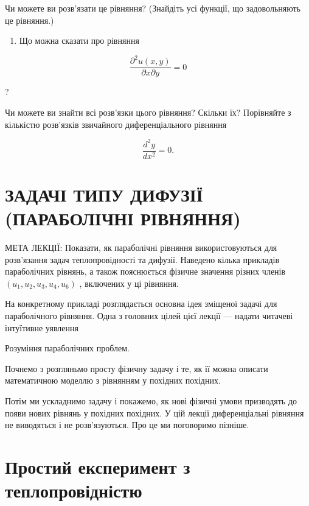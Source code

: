 \documentclass[
  ukrainian,
]{article}
\providecommand{\tightlist}{%
  \setlength{\itemsep}{0pt}\setlength{\parskip}{0pt}}
\begin{document}
Чи можете ви розв'язати це рівняння? (Знайдіть усі функції, що
задовольняють це рівняння.)

\begin{enumerate}
\def\labelenumi{\arabic{enumi}.}
\setcounter{enumi}{4}
\tightlist
\item
  Що можна сказати про рівняння
\end{enumerate}

\[\frac{\partial^2 u(x, y)}{\partial x \partial y} = 0\]

?

Чи можете ви знайти всі розв'язки цього рівняння? Скільки їх? Порівняйте
з кількістю розв'язків звичайного диференціального рівняння

\[\frac{d^2y}{dx^2} = 0.\]

\section{ЗАДАЧІ ТИПУ ДИФУЗІЇ (ПАРАБОЛІЧНІ
РІВНЯННЯ)}\label{ux437ux430ux434ux430ux447ux456-ux442ux438ux43fux443-ux434ux438ux444ux443ux437ux456ux457-ux43fux430ux440ux430ux431ux43eux43bux456ux447ux43dux456-ux440ux456ux432ux43dux44fux43dux43dux44f}

МЕТА ЛЕКЦІЇ: Показати, як параболічні рівняння використовуються для
розв'язання задач теплопровідності та дифузії. Наведено кілька прикладів
параболічних рівнянь, а також пояснюється фізичне значення різних членів
\((u_1, u_2, u_3, u_4, u_6)\) , включених у ці рівняння.

На конкретному прикладі розглядається основна ідея зміщеної задачі для
параболічного рівняння. Одна з головних цілей цієї лекції --- надати
читачеві інтуїтивне уявлення

Розуміння параболічних проблем.

Почнемо з розгляньмо просту фізичну задачу і те, як її можна описати
математичною моделлю з рівнянням у похідних похідних.

Потім ми ускладнимо задачу і покажемо, як нові фізичні умови призводять
до появи нових рівнянь у похідних похідних. У цій лекції диференціальні
рівняння не виводяться і не розв'язуються. Про це ми поговоримо пізніше.

\section{Простий експеримент з
теплопровідністю}\label{ux43fux440ux43eux441ux442ux438ux439-ux435ux43aux441ux43fux435ux440ux438ux43cux435ux43dux442-ux437-ux442ux435ux43fux43bux43eux43fux440ux43eux432ux456ux434ux43dux456ux441ux442ux44e}
\end{document}
